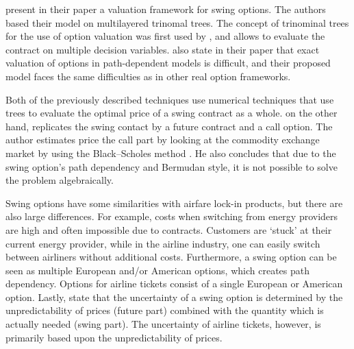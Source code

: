  present in their paper a valuation framework for swing options. The authors based their model on multilayered trinomal trees. The concept of trinominal trees for the use of option valuation was first used by , and allows to evaluate the contract on multiple decision variables.  also state in their paper that exact valuation of options in path-dependent models is difficult, and their proposed model faces the same difficulties as in other real option frameworks.

Both of the previously described techniques use numerical techniques that use trees to evaluate the optimal price of a swing contract as a whole. \cite{keppo2004pricing} on the other hand, replicates the swing contact by a future contract and a call option. The author estimates price the call part by looking at the commodity exchange market by using the Black--Scholes method \cite{black1976pricing}. He also concludes that due to the swing option's path dependency and Bermudan style, it is not possible to solve the problem algebraically.

Swing options have some similarities with airfare lock-in products, but there are also large differences. For example, costs when switching from energy providers are high and often impossible due to contracts. Customers are `stuck' at their current energy provider, while in the airline industry, one can easily switch between airliners without additional costs. Furthermore, a swing option can be seen as multiple European and/or American options, which creates path dependency. Options for airline tickets consist of a single European or American option. Lastly,  state that the uncertainty of a swing option is determined by the unpredictability of prices (future part) combined with the quantity which is actually needed (swing part). The uncertainty of airline tickets, however, is primarily based upon the unpredictability of prices.

